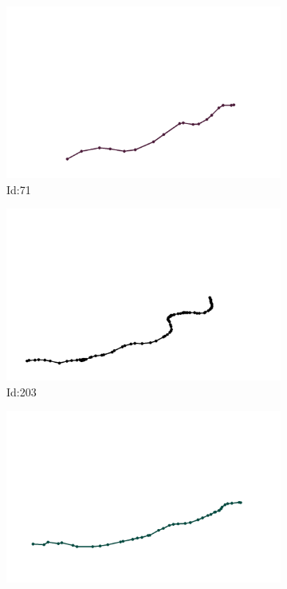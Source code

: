 \documentclass[12pt,twoside]{report}
\begin{document}
\begin{figure}
\centering
\begin{subfigure}[b]{0.20\textwidth}
\centering
\includegraphics[width=\textwidth]{../../trajectories/71.png}
\caption{Id:71}
\end{subfigure}
\begin{subfigure}[b]{0.20\textwidth}
\centering
\includegraphics[width=\textwidth]{../../trajectories/203.png}
\caption{Id:203}
\end{subfigure}
\begin{subfigure}[b]{0.20\textwidth}
\centering
\includegraphics[width=\textwidth]{../../trajectories/248.png}

\end{subfigure}
\end{figure}
\end{document}
